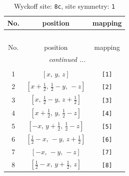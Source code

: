 \documentclass[fleqn,8pt]{jsarticle}
\begin{document}
\renewcommand{\arraystretch}{1.2}
\begin{longtable}{ccc}
\caption{Wyckoff site: {\tt 8c}, site symmetry: {\tt 1}}
 \\
 \hline \hline
No. & position & mapping \\ \hline \endfirsthead

\multicolumn{2}{l}{\tablename\ \thetable{}} \\
 \hline \hline
No. & position & mapping \\ \hline \endhead

 \hline \hline
\multicolumn{2}{r}{\footnotesize\it continued ...} \\ \endfoot

 \hline \hline
\multicolumn{2}{r}{} \\ \endlastfoot

1 & $\left[ x,\, y,\, z \right]$ & {\tt [1]} \\ \hline
2 & $\left[ x + \frac{1}{2},\, \frac{1}{2} - y,\, - z \right]$ & {\tt [2]} \\ \hline
3 & $\left[ x,\, \frac{1}{2} - y,\, z + \frac{1}{2} \right]$ & {\tt [3]} \\ \hline
4 & $\left[ x + \frac{1}{2},\, y,\, \frac{1}{2} - z \right]$ & {\tt [4]} \\ \hline
5 & $\left[ - x,\, y + \frac{1}{2},\, \frac{1}{2} - z \right]$ & {\tt [5]} \\ \hline
6 & $\left[ \frac{1}{2} - x,\, - y,\, z + \frac{1}{2} \right]$ & {\tt [6]} \\ \hline
7 & $\left[ - x,\, - y,\, - z \right]$ & {\tt [7]} \\ \hline
8 & $\left[ \frac{1}{2} - x,\, y + \frac{1}{2},\, z \right]$ & {\tt [8]} \\
\end{longtable}
\end{document}
